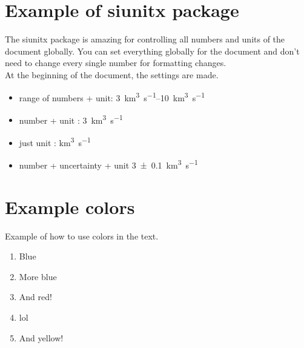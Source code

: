 \section{Example of siunitx package}
The siunitx package is amazing for controlling all numbers and units of the document globally. You can set everything globally for the document and don't need to change every single number for formatting changes.\\
At the beginning of the document, the settings are made.




\begin{itemize}
    \item range of numbers + unit:  \SIrange{3}{10}{\cubic\kilo\meter \per \second}
    \item number + unit : \SI{3}{\cubic\kilo\meter \per \second}
    \item just unit   : \si{\cubic\kilo\meter \per \second}
    \item number + uncertainty + unit \SI{3 \pm 0.1}{\cubic\kilo\meter \per \second}
\end{itemize}

\section{Example colors}
Example of how to use colors in the text.
\begin{enumerate}
\color{blue}
    \item Blue
    \item More blue
    \item {\color{red} And red!}
    \item \begingroup\color{green} lol   \endgroup
    \item {\color{yellow} And yellow!}
\end{enumerate}


